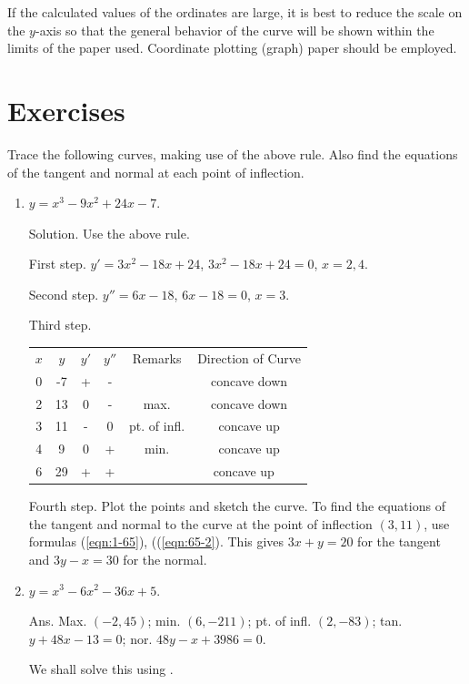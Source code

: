 If the calculated values of the ordinates are large, it is 
best to reduce the scale on the $y$-axis so that the general 
behavior of the curve will be shown within the limits of the 
paper used. Coordinate plotting (graph) paper should be employed.

\section{Exercises}

Trace the following curves, making use of the above rule. 
Also find the equations of the tangent and normal at each point of inflection.

\begin{enumerate}

\item
$y = x^3 - 9x^2 + 24x - 7$.

Solution. Use the above rule.

First step. $y' = 3x^2 - 18x + 24$,
$3x^2 - 18x + 24 	= 0$, $	x 	= 2,4$.

Second step. $y'' 	= 6x - 18$, $6x - 18 	= 0$,
$x 	= 3$.

Third step.

\begin{tabular}{cccccc}
$x$ &	$y$ &	$y'$ &	$y''$& 	Remarks &	Direction of Curve\\
0 &	-7& 	+ &	- &	        &     concave down   \\
2 &	13 &	0 &	- &       max.  &     concave down         \\
3 &	11 &	- &	0  &   pt. of infl. & concave up  \\
4 &	9 &	0 &	+ &    min. 	&   concave up     \\
6 &	29 &	+ &	+ &            &  concave up \

\end{tabular}

Fourth step. Plot the points and sketch the curve. %
To find the equations of the tangent 
and normal to the curve at the point of inflection $(3,11)$, use 
formulas (\ref{eqn:1-65}), ((\ref{eqn:65-2}). %
This gives $3x + y = 20$ for the tangent and $3y - x = 30$ for the normal.

\item
$y = x^3 - 6x^2 - 36x + 5$.

Ans. Max. $(-2, 45)$; min. $(6, -211)$; pt. of infl. $(2, -83)$; 
tan. $y + 48x - 13 = 0$; nor. $48y - x + 3986 = 0$.

We shall solve this using \sage.


\end{enumerate}
